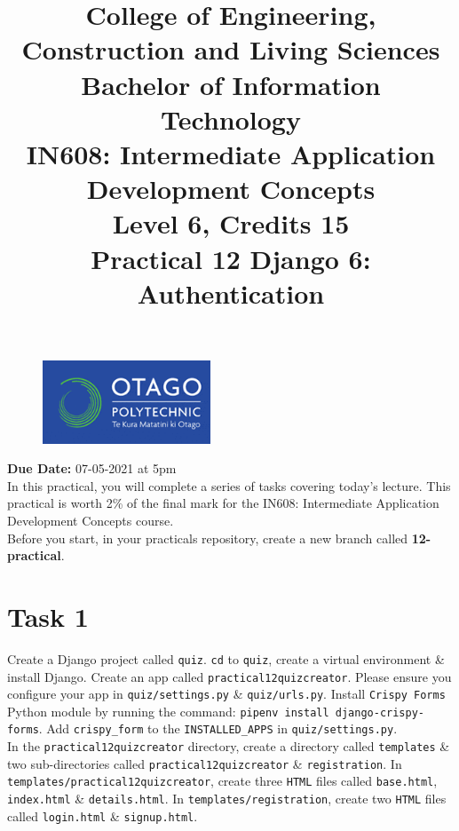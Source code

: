\documentclass{article}
\author{}
\begin{document}
\begin{figure}
	\centering
	\includegraphics[width=50mm]{./img/logo.png}
\end{figure}

\title{College of Engineering, Construction and Living Sciences\\Bachelor of Information Technology\\IN608: Intermediate Application Development Concepts\\Level 6, Credits 15\\\textbf{Practical 12 Django 6: Authentication}} 
\date{}
\maketitle

\textbf{Due Date:} 07-05-2021 at 5pm \\

In this practical, you will complete a series of tasks covering today's lecture. This practical is worth 2\% of the final mark for the IN608: Intermediate Application Development Concepts course. \\

Before you start, in your practicals repository, create a new branch called \textbf{12-practical}.

\section*{Task 1} 
Create a Django project called \texttt{quiz}. \texttt{cd} to \texttt{quiz}, create a virtual environment \& install Django. Create an app called \texttt{practical12quizcreator}. Please ensure you configure your app in \texttt{quiz/settings.py} \& \texttt{quiz/urls.py}. Install \texttt{Crispy Forms} Python module by running the command: \texttt{pipenv install django-crispy-forms}. Add \texttt{crispy\_form} to the \texttt{INSTALLED\_APPS} in \texttt{quiz/settings.py}. \\

In the \texttt{practical12quizcreator} directory, create a directory called \texttt{templates} \& two sub-directories called \texttt{practical12quizcreator} \& \texttt{registration}. In \texttt{templates/practical12quizcreator}, create three \texttt{HTML} files called \texttt{base.html}, \texttt{index.html} \& \texttt{details.html}. In \texttt{templates/registration}, create two \texttt{HTML} files called \texttt{login.html} \& \texttt{signup.html}. \\
\end{document}
